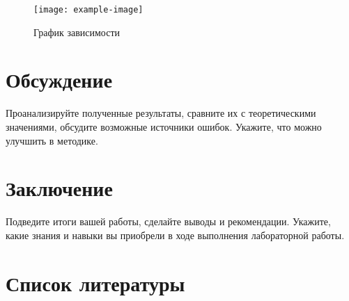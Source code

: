 \documentclass[a4paper,12pt]{article}
\begin{document}
\begin{figure}[h]
    \centering
    \texttt{[image: example-image]} %
    \caption{График зависимости}
\end{figure}

\section{Обсуждение}
Проанализируйте полученные результаты, сравните их с теоретическими значениями, обсудите возможные источники ошибок. Укажите, что можно улучшить в методике.

\section{Заключение}
Подведите итоги вашей работы, сделайте выводы и рекомендации. Укажите, какие знания и навыки вы приобрели в ходе выполнения лабораторной работы.

\section{Список литературы}


\end{document}
